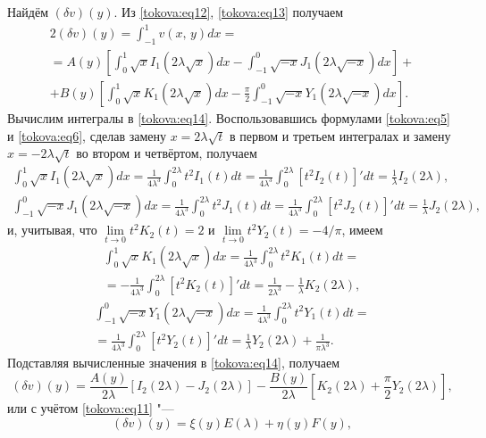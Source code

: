 Найдём $(\delta v)(y)$. Из \eqref{tokova:eq12}, \eqref{tokova:eq13} получаем
\begin{multline}
\label{tokova:eq14}
2 (\delta v)(y)=\int _{-1}^1 v(x,\,y)dx= \\ = A(y)\left[\int _0^1
\sqrt x I_1(2\lambda \sqrt x) dx -\int _{-1}^0 \sqrt {-x} J_1(2 \lambda \sqrt{-x}) dx \right]+\\
 +B(y)\left[\int _0^1 \sqrt x K_1(2 \lambda \sqrt{x}) dx- \frac{\pi}{ 2}\int _{-1}^0 \sqrt {-x} Y_1 (2 \lambda \sqrt{-x}) dx\right].
\end{multline}
Вычислим интегралы в \eqref{tokova:eq14}. 
Воспользовавшись формулами \eqref{tokova:eq5} и \eqref{tokova:eq6}, сделав замену $x=2\lambda \sqrt t$ в первом и третьем интегралах и замену $x=-2\lambda \sqrt t$ во втором и четвёртом, получаем
\begin{gather*}
\int _0^1 \sqrt x I_1 (2 \lambda \sqrt{x}) dx=\frac{1}{4\lambda^3} \int _0^{2\lambda} t^2 I_1(t)dt= \frac{1}{4\lambda^3}
\int _0^{2\lambda} \left[t^2 I_2(t)\right]'dt=\frac{1}{\lambda} I_2 (2 \lambda),\\
\int _{-1}^0 \sqrt {-x} J_1 (2 \lambda \sqrt{-x}) dx=\frac{1}{4\lambda^3} \int _0^{2\lambda} t^2
J_1(t)dt= \frac{1}{4\lambda^3} \int _0^{2\lambda} \left[t^2 J_2(t)\right]'dt=\frac{1}{\lambda} J_2 (2 \lambda),
\end{gather*}
и, учитывая, что $\lim \limits_{t \rightarrow 0} t^2 K_2(t)=2$
и $\lim \limits_{t \rightarrow 0} t^2 Y_2(t)=-{4}/{\pi}$, имеем
\begin{multline*}
\int _0^1 \sqrt x K_1 (2 \lambda \sqrt x) dx=\frac{1}{4\lambda^3}\int _0^{2\lambda} t^2 K_1(t)dt= \\ =
-\frac{1}{4\lambda^3}\int _0^{2\lambda} \left[t^2 K_2(t)\right]'dt=\frac {1}{2\lambda^3}-\frac{1}{\lambda} K_2(2 \lambda), 
\end{multline*}
\begin{multline*}
\int _{-1}^0 \sqrt{-x} Y_1(2 \lambda \sqrt{-x}) dx=\frac{1}{4\lambda^3}\int _0^{2\lambda} t^2 Y_1(t)dt= \\ =
\frac{1}{4\lambda^3}\int _0^{2\lambda} \left[t^2 Y_2(t)\right]'dt=\frac{1}{\lambda}
Y_2(2 \lambda)+\frac{ 1}{\pi\lambda^3}.
\end{multline*}
Подставляя вычисленные значения в \eqref{tokova:eq14}, получаем
\[
(\delta v)(y)= \frac{A(y)}{2\lambda} \left[I_2(2 \lambda)- J_2(2 \lambda) \right] -  \frac{B(y)}{2\lambda}
\left[K_2(2 \lambda)+ \frac{\pi}{2}Y_2 (2 \lambda)\right],
\]
или с учётом \eqref{tokova:eq11} "---
\begin{equation}
\label{tokova:eq15}
(\delta v)(y)= \xi (y)E(\lambda)+\eta(y)F(y),
\end{equation}
